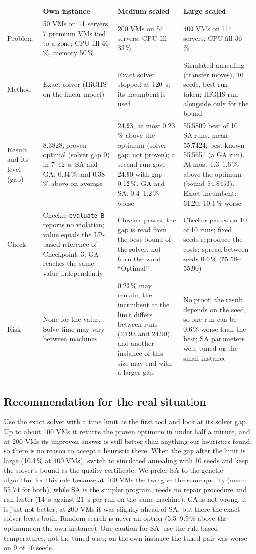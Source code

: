 \documentclass[11pt,a4paper]{article}
\begin{document}
{\small
\begin{tabularx}{\textwidth}{@{}p{1.6cm}XXX@{}}
\toprule
 & Own instance & Medium scaled & Large scaled\\
\midrule
Problem & 50 VMs on 11 servers, 7 premium VMs tied to a zone; CPU fill 46\,\%, memory 50\,\% & 200 VMs on 57 servers; CPU fill 33\,\% & 400 VMs on 114 servers; CPU fill 36\,\% \\
Method & Exact solver (HiGHS on the linear model) & Exact solver stopped at 120~s; its incumbent is used & Simulated annealing (transfer moves), 10 seeds, best run taken; HiGHS run alongside only for the bound\\
Result and its level (gap) & 8.3828, proven optimal (solver gap 0) in 7--12~s. SA and GA: 0.34\,\% and 0.38\,\% above on average & 24.93, at most 0.23\,\% above the optimum (solver gap; not proven); a second run gave 24.90 with gap 0.12\,\%. GA and SA: 0.4--1.2\,\% worse & 55.5809 best of 10 SA runs, mean 55.7424; best known 55.5651 (a GA run). At most 1.3--1.6\,\% above the optimum (bound 54.8453). Exact incumbent: 61.20, 10.1\,\% worse\\
Check & Checker \texttt{evaluate\_B} reports no violation; value equals the LP-based reference of Checkpoint~3; GA reaches the same value independently & Checker passes; the gap is read from the best bound of the solver, not from the word ``Optimal'' & Checker passes on 10 of 10 runs; fixed seeds reproduce the costs; spread between seeds 0.6\,\% (55.58--55.90) \\
Risk & None for the value. Solve time may vary between machines & 0.23\,\% may remain; the incumbent at the limit differs between runs (24.93 and 24.90), and another instance of this size may end with a larger gap & No proof; the result depends on the seed, so one run can be 0.6\,\% worse than the best; SA parameters were tuned on the small instance\\
\bottomrule
\end{tabularx}}

\subsection*{Recommendation for the real situation}
Use the exact solver with a time limit as the first tool and look at its solver gap. Up to about 100 VMs it returns the proven optimum in under half a minute, and at 200 VMs its unproven answer is still better than anything our heuristics found, so there is no reason to accept a heuristic there. When the gap after the limit is large (10.4\,\% at 400 VMs), switch to simulated annealing with 10 seeds and keep the solver's bound as the quality certificate. We prefer SA to the genetic algorithm for this role because at 400 VMs the two give the same quality (mean 55.74 for both), while SA is the simpler program, needs no repair procedure and ran faster (14~s against 21~s per run on the same machine). GA is not wrong, it is just not better; at 200 VMs it was slightly ahead of SA, but there the exact solver beats both. Random search is never an option (5.5--9.9\,\% above the optimum on the own instance). One caution for SA: use the rule-based temperatures, not the tuned ones; on the own instance the tuned pair was worse on 9 of 10 seeds.
\end{document}
